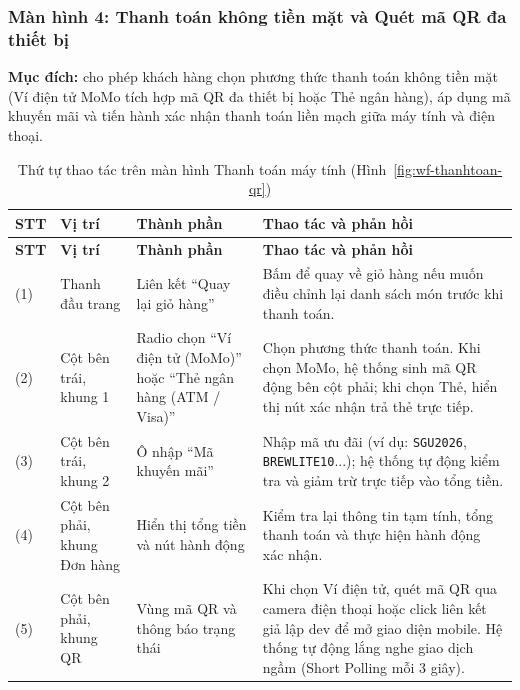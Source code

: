 \subsubsection{Màn hình 4: Thanh toán không tiền mặt và Quét mã QR đa thiết bị}
\label{subsec:wf-thanhtoan}
\textbf{Mục đích:} cho phép khách hàng chọn phương thức thanh toán không tiền mặt (Ví điện tử MoMo tích hợp mã QR đa thiết bị hoặc Thẻ ngân hàng), áp dụng mã khuyến mãi và tiến hành xác nhận thanh toán liền mạch giữa máy tính và điện thoại.

\begin{minipage}{\textwidth}
  \centering
  \hfill
  \label{fig:wf-thanhtoan-qr}
\end{minipage}

\vspace{10pt}

\begin{longtable}{|p{1.0cm}|p{2.5cm}|p{4.5cm}|p{5.5cm}|}
  \caption{Thứ tự thao tác trên màn hình Thanh toán máy tính (Hình~\ref{fig:wf-thanhtoan-qr})}\label{tab:wf-thanhtoan}\\
  \hline
  \textbf{STT} & \textbf{Vị trí} & \textbf{Thành phần} & \textbf{Thao tác và phản hồi} \\
  \hline
  \endfirsthead
  \hline
  \textbf{STT} & \textbf{Vị trí} & \textbf{Thành phần} & \textbf{Thao tác và phản hồi} \\
  \hline
  \endhead
  (1) & Thanh đầu trang & Liên kết ``Quay lại giỏ hàng'' & Bấm để quay về giỏ hàng nếu muốn điều chỉnh lại danh sách món trước khi thanh toán. \\
  \hline
  (2) & Cột bên trái, khung 1 & Radio chọn ``Ví điện tử (MoMo)'' hoặc ``Thẻ ngân hàng (ATM / Visa)'' & Chọn phương thức thanh toán. Khi chọn MoMo, hệ thống sinh mã QR động bên cột phải; khi chọn Thẻ, hiển thị nút xác nhận trả thẻ trực tiếp. \\
  \hline
  (3) & Cột bên trái, khung 2 & Ô nhập ``Mã khuyến mãi'' & Nhập mã ưu đãi (ví dụ: \texttt{SGU2026}, \texttt{BREWLITE10}...); hệ thống tự động kiểm tra và giảm trừ trực tiếp vào tổng tiền. \\
  \hline
  (4) & Cột bên phải, khung Đơn hàng & Hiển thị tổng tiền và nút hành động & Kiểm tra lại thông tin tạm tính, tổng thanh toán và thực hiện hành động xác nhận. \\
  \hline
  (5) & Cột bên phải, khung QR & Vùng mã QR và thông báo trạng thái & Khi chọn Ví điện tử, quét mã QR qua camera điện thoại hoặc click liên kết giả lập dev để mở giao diện mobile. Hệ thống tự động lắng nghe giao dịch ngầm (Short Polling mỗi 3 giây). \\
  \hline
\end{longtable}

